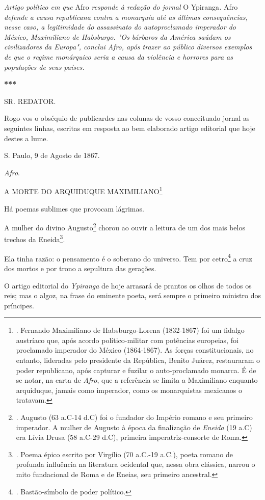 \emph{Artigo político em que} Afro \emph{responde à redação do jornal} O
Ypiranga\emph{.} Afro \emph{defende a causa republicana contra a
monarquia até as últimas consequências, nesse caso, a legitimidade do
assassinato do autoproclamado imperador do México, Maximiliano de
Habsburgo. "Os bárbaros da América saúdam os civilizadores da Europa",
conclui Afro, após trazer ao público diversos exemplos de que o regime
monárquico seria a causa da violência e horrores para as populações de
seus países.}

\textbf{***}

SR. REDATOR.

Rogo-vos o obséquio de publicardes nas colunas de vosso conceituado
jornal as seguintes linhas, escritas em resposta ao bem elaborado artigo
editorial que hoje destes a lume.

S. Paulo, 9 de Agosto de 1867.

\emph{Afro}.

A MORTE DO ARQUIDUQUE MAXIMILIANO\footnote{. Fernando Maximiliano de
  Habsburgo-Lorena (1832-1867) foi um fidalgo austríaco que, após acordo
  político-militar com potências europeias, foi proclamado imperador do
  México (1864-1867). As forças constitucionais, no entanto, lideradas
  pelo presidente da República, Benito Juárez, restauraram o poder
  republicano, após capturar e fuzilar o auto-proclamado monarca. É de
  se notar, na carta de \emph{Afro}, que a referência se limita a
  Maximiliano enquanto arquiduque, jamais como imperador, como os
  monarquistas mexicanos o tratavam.}

Há poemas sublimes que provocam lágrimas.

A mulher do divino Augusto\footnote{. Augusto (63 a.C-14 d.C) foi o
  fundador do Império romano e seu primeiro imperador. A mulher de
  Augusto à época da finalização de \emph{Eneida} (19 a.C) era Lívia
  Drusa (58 a.C-29 d.C), primeira imperatriz-consorte de Roma.} chorou
ao ouvir a leitura de um dos mais belos trechos da Eneida\footnote{.
  Poema épico escrito por Virgílio (70 a.C.-19 a.C.), poeta romano de
  profunda influência na literatura ocidental que, nessa obra clássica,
  narrou o mito fundacional de Roma e de Eneias, seu primeiro ancestral.}.

Ela tinha razão: o pensamento é o soberano do universo. Tem por
cetro\footnote{. Bastão-símbolo de poder político.} a cruz dos mortos e
por trono a sepultura das gerações.

O artigo editorial do \emph{Ypiranga} de hoje arrasará de prantos os
olhos de todos os reis; mas o algoz, na frase do eminente poeta, será
sempre o primeiro ministro dos príncipes.

